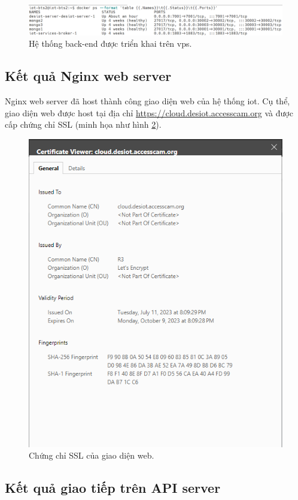\begin{figure}[htp]
\centering
\captionsetup{justification=centering}
\includegraphics[width=1.0\linewidth, frame]{images/fig-docker-ps-vps.png}
\caption{Hệ thống back-end được triển khai trên \acrshort{vps}.}
\label{fig:docker-ps-vps}
\end{figure}

\subsection{Kết quả Nginx web server}

Nginx web server đã host thành công giao diện web của hệ thống \acrshort{iot}. Cụ thể, giao diện web được host tại địa chỉ \href{https://cloud.desiot.accesscam.org}{https://cloud.desiot.accesscam.org} và được cấp chứng chỉ SSL (minh họa như hình \ref{fig:ssl-cert}).

\begin{figure}[htp]
\centering
\captionsetup{justification=centering}
\includegraphics[width=0.6\linewidth, frame]{images/fig-ssl-cert.png}
\caption{Chứng chỉ SSL của giao diện web.}
\label{fig:ssl-cert}
\end{figure}

\subsection{Kết quả giao tiếp trên API server}

